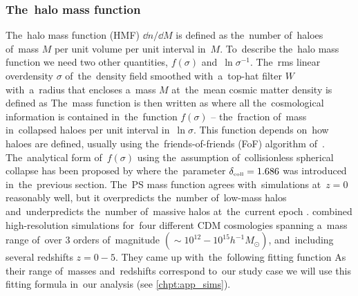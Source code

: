 \subsubsection{The~halo mass function}
The~halo mass function (HMF) $\dd n/\dd M$ is defined as the~number of~haloes of~mass $M$ per unit volume per unit interval in~$M$. To~describe the~halo mass function we need two other quantities, $f(\sigma)$ and~$\ln\sigma^{-1}$. The~rms linear overdensity $\sigma$ of~the~density field smoothed with~a~top-hat filter $W$ with~a~radius that encloses a~mass $M$ at~the~mean cosmic matter density is defined as \parencite{2015IJMPD..2430004B}
The~mass function is then written as
where all the~cosmological information is contained in~the~function \(f(\sigma)\) --  the~fraction of~mass in~collapsed haloes per unit interval in~$\ln\sigma$. This function depends on~how haloes are defined, usually using the~friends-of-friends (FoF) algorithm of~\textcite{1985ApJ...292..371D}. The~analytical form of~$f(\sigma)$ using the~assumption of~collisionless spherical collapse has been proposed by \textcite{1974ApJ...187..425P}
where the~parameter \(\delta_\text{\tiny coll}=1.686\) was introduced in~the~previous section. The~PS mass function agrees with~simulations at~$z=0$ reasonably well, but it overpredicts the~number of~low-mass halos and~underpredicts the~number of~massive halos at~the~current epoch \parencite{2007ApJ...671.1160L}. \textcite{2001MNRAS.321..372J} combined high-resolution simulations for~four different CDM cosmologies spanning a~mass range of~over 3 orders of~magnitude $(\sim10^{12}-10^{15}h^{-1}M_\odot)$, and~including several redshifts $z=0-5$. They came up with~the~following fitting function
As their range of~masses and~redshifts correspond to~our study case we will use this fitting formula in~our analysis (see \autoref{chpt:app_sims}).
